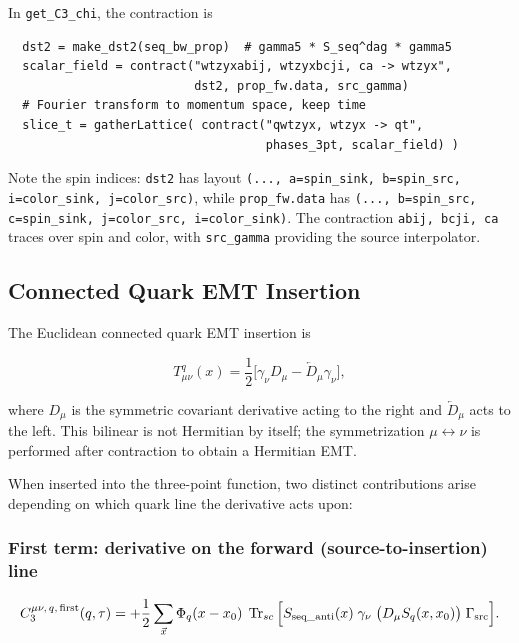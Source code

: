 \documentclass[11pt,a4paper]{article}
\newcommand{\code}[1]{\texttt{#1}}
\begin{document}
In \code{get\_C3\_chi}, the contraction is
\begin{verbatim}
  dst2 = make_dst2(seq_bw_prop)  # gamma5 * S_seq^dag * gamma5
  scalar_field = contract("wtzyxabij, wtzyxbcji, ca -> wtzyx",
                          dst2, prop_fw.data, src_gamma)
  # Fourier transform to momentum space, keep time
  slice_t = gatherLattice( contract("qwtzyx, wtzyx -> qt",
                                    phases_3pt, scalar_field) )
\end{verbatim}
Note the spin indices: \code{dst2} has layout \code{(..., a=spin\_sink, b=spin\_src, i=color\_sink, j=color\_src)}, while \code{prop\_fw.data} has \code{(..., b=spin\_src, c=spin\_sink, j=color\_src, i=color\_sink)}. The contraction \code{abij, bcji, ca} traces over spin and color, with \code{src\_gamma} providing the source interpolator.

\subsection{Connected Quark EMT Insertion}
\label{sec:quark_emt_connected}

The Euclidean connected quark EMT insertion is

\begin{equation}\label{eq:Tmunu_q_bilinear}
  T_{\mu\nu}^q(x) = \frac{1}{2}\Big[
    \gamma_\nu D_\mu - \overleftarrow{D}_\mu \gamma_\nu
  \Big],
\end{equation}

where $D_\mu$ is the symmetric covariant derivative acting to the right and $\overleftarrow{D}_\mu$ acts to the left. This bilinear is not Hermitian by itself; the symmetrization $\mu \leftrightarrow \nu$ is performed after contraction to obtain a Hermitian EMT.

When inserted into the three-point function, two distinct contributions arise depending on which quark line the derivative acts upon:

\subsubsection{First term: derivative on the forward (source-to-insertion) line}

\begin{equation}\label{eq:C3_first}
  C_3^{\mu\nu,\,q,\,\text{first}}(q, \tau)
    = +\frac{1}{2} \sum_{\vec{x}} \Phi_q(x - x_0)\;
      \Tr_{sc}\Big[
        S_{\text{seq\_anti}}(x)\;
        \gamma_\nu\; \big(D_\mu S_q(x, x_0)\big)\;
        \Gamma_{\text{src}}
      \Big].
\end{equation}
\end{document}
